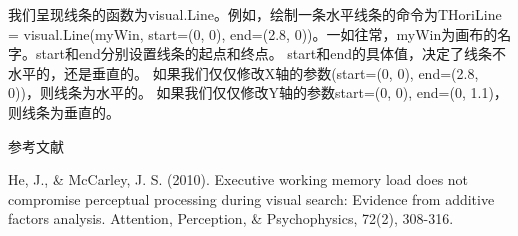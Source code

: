 \documentclass[11pt]{article}
\begin{document}
我们呈现线条的函数为visual.Line。例如，绘制一条水平线条的命令为THoriLine
= visual.Line(myWin, start=(0, 0), end=(2.8,
0))。一如往常，myWin为画布的名字。start和end分别设置线条的起点和终点。
start和end的具体值，决定了线条不水平的，还是垂直的。
如果我们仅仅修改X轴的参数(start=(0, 0), end=(2.8, 0))，则线条为水平的。
如果我们仅仅修改Y轴的参数start=(0, 0), end=(0, 1.1)，则线条为垂直的。

    参考文献

He, J., \& McCarley, J. S. (2010). Executive working memory load does
not compromise perceptual processing during visual search: Evidence from
additive factors analysis. Attention, Perception, \& Psychophysics,
72(2), 308-316.


    
    
    
    
\end{document}
